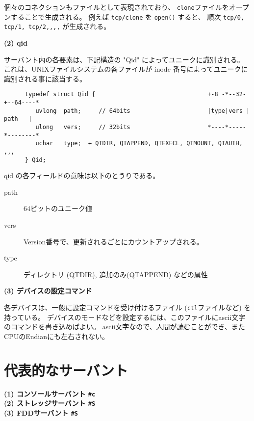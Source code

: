 {  個々のコネクションもファイルとして表現されており、
{\tt clone}ファイルをオープンすることで生成される。
例えば  {\tt tcp/clone} を {\tt open()} すると、
順次 {\tt tcp/0, tcp/1, tcp/2,,,,}  が生成される。
    
{\bf\flushleft  (2) qid}

  サーバント内の各要素は、下記構造の "Qid" によってユニークに識別される。
これは、UNIXファイルシステムの各ファイルが inode 番号によってユニークに識別される事に該当する。

\begin{verbatim}    
      typedef struct Qid {                                +-8 -*--32-+--64----*
         uvlong  path;     // 64bits                      |type|vers | path   |
         ulong   vers;     // 32bits                      *----*-----*--------*
         uchar   type;  ← QTDIR, QTAPPEND, QTEXECL, QTMOUNT, QTAUTH, ,,,
      } Qid;
\end{verbatim}    

    qid の各フィールドの意味は以下のとうりである。
\begin{description}
\item[path]  64ビットのユニーク値
\item[vers]  Version番号で、更新されるごとにカウントアップされる。
\item[type]  ディレクトリ (QTDIR), 追加のみ(QTAPPEND) などの属性
\end{description}
    
{\bf\flushleft (3) デバイスの設定コマンド}

   各デバイスは、一般に設定コマンドを受け付けるファイル ({\tt ctl}ファイルなど) を持っている。
  デバイスのモードなどを設定するには、このファイルにascii文字のコマンドを書き込めばよい。
  ascii文字なので、人間が読むことができ、またCPUのEndianにも左右されない。





\section{代表的なサーバント}


{\bf\flushleft (1) コンソールサーバント \verb|#c|}
\\

{\bf\flushleft (2) ストレッジサーバント \verb|#S|}
\\

{\bf\flushleft (3) FDDサーバント \verb|#S|}
\\

}
